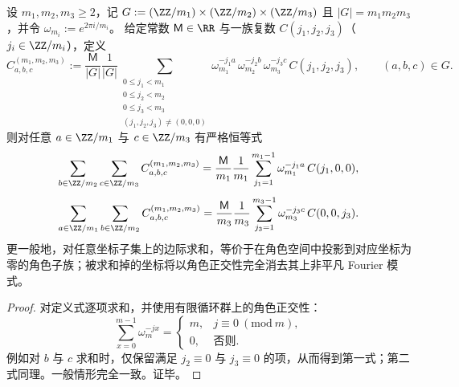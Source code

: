 \begin{lemma}[边际求和即角色投影]\label{lem:arity-character-projection}
设 \(m_1,m_2,m_3\ge 2\)，记
\(
G:=(\ZZ/m_1)\times(\ZZ/m_2)\times(\ZZ/m_3)
\)
且 \(|G|=m_1m_2m_3\)，并令 \(\omega_{m_i}:=e^{2\pi i/m_i}\)。
给定常数 \(\mathsf{M}\in\RR\) 与一族复数 \(C(j_1,j_2,j_3)\)（\(j_i\in\ZZ/m_i\)），定义
\[
C^{(m_1,m_2,m_3)}_{a,b,c}
:=
\frac{\mathsf{M}}{|G|}
\frac{1}{|G|}
\!\!\!\sum_{\substack{0\le j_1<m_1\\0\le j_2<m_2\\0\le j_3<m_3\\(j_1,j_2,j_3)\ne(0,0,0)}}
\omega_{m_1}^{-j_1a}\,\omega_{m_2}^{-j_2b}\,\omega_{m_3}^{-j_3c}\,C(j_1,j_2,j_3),
\qquad (a,b,c)\in G.
\]
则对任意 \(a\in\ZZ/m_1\) 与 \(c\in\ZZ/m_3\) 有严格恒等式
\[
\sum_{b\in\ZZ/m_2}\sum_{c\in\ZZ/m_3} C^{(m_1,m_2,m_3)}_{a,b,c}
=
\frac{\mathsf{M}}{m_1}
\frac{1}{m_1}\sum_{j_1=1}^{m_1-1}\omega_{m_1}^{-j_1a}\,C(j_1,0,0),
\]
\[
\sum_{a\in\ZZ/m_1}\sum_{b\in\ZZ/m_2} C^{(m_1,m_2,m_3)}_{a,b,c}
=
\frac{\mathsf{M}}{m_3}
\frac{1}{m_3}\sum_{j_3=1}^{m_3-1}\omega_{m_3}^{-j_3c}\,C(0,0,j_3).
\]
更一般地，对任意坐标子集上的边际求和，等价于在角色空间中投影到对应坐标为零的角色子族；被求和掉的坐标将以角色正交性完全消去其上非平凡 Fourier 模式。
\end{lemma}

\begin{proof}
对定义式逐项求和，并使用有限循环群上的角色正交性：
\[
\sum_{x=0}^{m-1}\omega_m^{-jx}
=
\begin{cases}
m,& j\equiv 0\ (\mathrm{mod}\ m),\\
0,& \text{否则}.
\end{cases}
\]
例如对 \(b\) 与 \(c\) 求和时，仅保留满足 \(j_2\equiv 0\) 与 \(j_3\equiv 0\) 的项，从而得到第一式；第二式同理。一般情形完全一致。证毕。
\end{proof}

